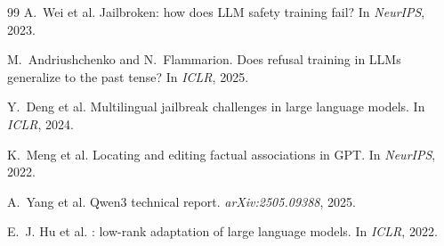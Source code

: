 \documentclass{esannV2}
\begin{document}
\begin{scriptsize}
\begin{thebibliography}{99}
A.~Wei et al.
\newblock Jailbroken: how does {LLM} safety training fail?
\newblock In \emph{NeurIPS}, 2023.

M.~Andriushchenko and N.~Flammarion.
\newblock Does refusal training in {LLMs} generalize to the past tense?
\newblock In \emph{ICLR}, 2025.

Y.~Deng et al.
\newblock Multilingual jailbreak challenges in large language models.
\newblock In \emph{ICLR}, 2024.

K.~Meng et al.
\newblock Locating and editing factual associations in {GPT}.
\newblock In \emph{NeurIPS}, 2022.

A.~Yang et al.
\newblock Qwen3 technical report.
\newblock \emph{arXiv:2505.09388}, 2025.

E.~J. Hu et al.
: low-rank adaptation of large language models.
\newblock In \emph{ICLR}, 2022.

\end{thebibliography}
\end{scriptsize}
\end{document}
